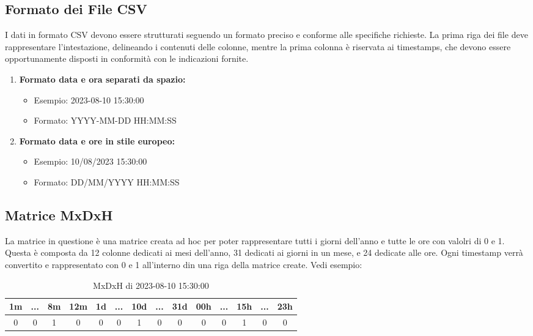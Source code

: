 \documentclass[a4paper,10pt]{article}
\begin{document}
\subsection{Formato dei File CSV}

I dati in formato CSV devono essere strutturati seguendo un formato preciso e conforme alle specifiche richieste. 
La prima riga dei file deve rappresentare l'intestazione, delineando i contenuti delle colonne, mentre la prima colonna è riservata ai timestamps, 
che devono essere opportunamente disposti in conformità con le indicazioni fornite.
\begin{enumerate} 
  \item \textbf{Formato data e ora separati da spazio:}
  \begin{itemize}
    \item Esempio: 2023-08-10 15:30:00
    \item Formato: YYYY-MM-DD HH:MM:SS
  \end{itemize}
  \item \textbf{Formato data e ore in stile europeo:}
  \begin{itemize}
    \item Esempio: 10/08/2023 15:30:00
    \item Formato: DD/MM/YYYY HH:MM:SS
  \end{itemize} 
\end{enumerate}


\subsection{Matrice MxDxH}

La matrice in questione è una matrice creata ad hoc per poter rappresentare tutti i giorni dell'anno e tutte le ore con valolri di 0 e 1.
Questa è composta da 12 colonne dedicati ai mesi dell'anno, 31 dedicati ai giorni in un mese, e 24 dedicate alle ore.
Ogni timestamp verrà convertito e rappresentato con 0 e 1 all'interno din una riga della matrice create. Vedi esempio:
 
\begin{table}[h]\centering
  \begin{tabular}{|*{14}{c|}}
  
  \hline
  1m & ... & 8m & 12m & 1d & ... & 10d & ... & 31d & 00h & ... & 15h & ... & 23h\\
  \hline
  0 & 0 & 1 & 0 & 0 & 0 & 1 & 0 & 0 & 0 & 0 & 1 & 0 & 0\\
  \hline
  
  \end{tabular}
  
  \caption{MxDxH di 2023-08-10 15:30:00}
\end{table}
\end{document}
